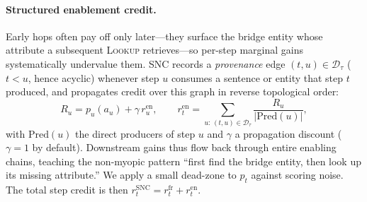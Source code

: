 \documentclass[letterpaper]{article} %
\begin{document}
\paragraph{Structured enablement credit.}
Early hops often pay off only later---they surface the bridge entity whose attribute a subsequent \textsc{Lookup} retrieves---so per-step marginal gains systematically undervalue them. SNC records a \emph{provenance} edge $(t,u)\in\mathcal{D}_\tau$ ($t<u$, hence acyclic) whenever step $u$ consumes a sentence or entity that step $t$ produced, and propagates credit over this graph in reverse topological order:
\begin{equation}
R_u=p_u(a_u)+\gamma\,r_u^{\mathrm{en}},
\qquad
r_t^{\mathrm{en}}=\sum_{u:\,(t,u)\in\mathcal{D}_\tau} \frac{R_u}{|\mathrm{Pred}(u)|},
\label{eq:enable}
\end{equation}
with $\mathrm{Pred}(u)$ the direct producers of step $u$ and $\gamma$ a propagation discount ($\gamma{=}1$ by default). Downstream gains thus flow back through entire enabling chains, teaching the non-myopic pattern ``first find the bridge entity, then look up its missing attribute.'' We apply a small dead-zone to $p_t$ against scoring noise. The total step credit is then $r_t^{\mathrm{SNC}}=r_t^{\mathrm{fr}}+r_t^{\mathrm{en}}$.
\end{document}
